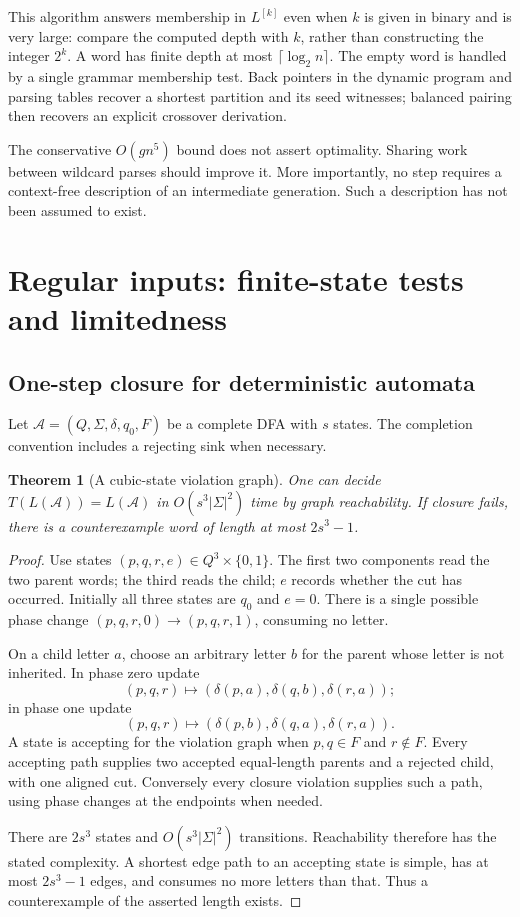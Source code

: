 \documentclass[11pt,letterpaper]{article}
\newtheorem{theorem}{Theorem}[section]
\theoremstyle{definition}
\theoremstyle{remark}
\newcommand{\gen}[2]{#1^{[#2]}}
\begin{document}
This algorithm answers membership in $\gen Lk$ even when $k$ is given in
binary and is very large: compare the computed depth with $k$, rather than
constructing the integer $2^k$. A word has finite depth at most
$\lceil\log_2 n\rceil$. The empty word is handled by a single grammar
membership test. Back pointers in the dynamic program and parsing tables
recover a shortest partition and its seed witnesses; balanced pairing then
recovers an explicit crossover derivation.

The conservative $O(gn^5)$ bound does not assert optimality. Sharing work
between wildcard parses should improve it. More importantly, no step requires
a context-free description of an intermediate generation. Such a description
has not been assumed to exist.

\section{Regular inputs: finite-state tests and limitedness}
\label{ccc:sec:regular}

\subsection{One-step closure for deterministic automata}

Let $\mathcal A=(Q,\Sigma,\delta,q_0,F)$ be a complete DFA with $s$ states.
The completion convention includes a rejecting sink when necessary.

\begin{theorem}[A cubic-state violation graph]\label{ccc:thm:dfa}
One can decide $T(L(\mathcal A))=L(\mathcal A)$ in
$O(s^3|\Sigma|^2)$ time by graph reachability. If closure fails, there is a
counterexample word of length at most $2s^3-1$.
\end{theorem}
\begin{proof}
Use states $(p,q,r,e)\in Q^3\times\{0,1\}$. The first two components read
the two parent words; the third reads the child; $e$ records whether the cut
has occurred. Initially all three states are $q_0$ and $e=0$.
There is a single possible phase change
$(p,q,r,0)\to(p,q,r,1)$, consuming no letter.

On a child letter $a$, choose an arbitrary letter $b$ for the parent whose
letter is not inherited. In phase zero update
\[
 (p,q,r)\longmapsto(\delta(p,a),\delta(q,b),\delta(r,a));
\]
in phase one update
\[
 (p,q,r)\longmapsto(\delta(p,b),\delta(q,a),\delta(r,a)).
\]
A state is accepting for the violation graph when $p,q\in F$ and $r\notin F$.
Every accepting path supplies two accepted equal-length parents and a rejected
child, with one aligned cut. Conversely every closure violation supplies such
a path, using phase changes at the endpoints when needed.

There are $2s^3$ states and $O(s^3|\Sigma|^2)$ transitions. Reachability
therefore has the stated complexity. A shortest edge path to an accepting
state is simple, has at most $2s^3-1$ edges, and consumes no more letters than
that. Thus a counterexample of the asserted length exists.
\end{proof}
\end{document}
